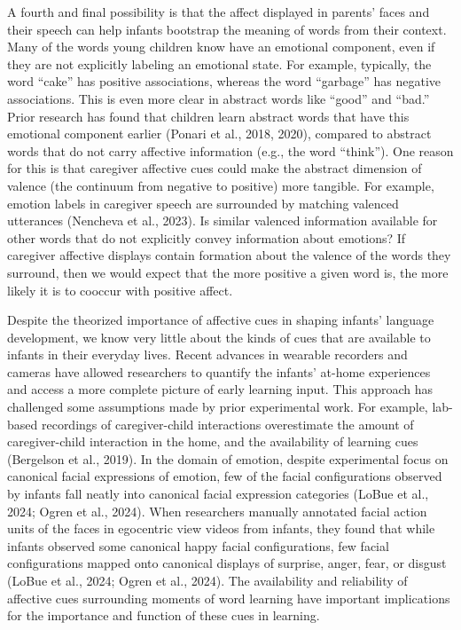 \documentclass[10pt, letterpaper]{article}
\begin{document}
A fourth and final possibility is that the affect displayed in parents'
faces and their speech can help infants bootstrap the meaning of words
from their context. Many of the words young children know have an
emotional component, even if they are not explicitly labeling an
emotional state. For example, typically, the word ``cake'' has positive
associations, whereas the word ``garbage'' has negative associations.
This is even more clear in abstract words like ``good'' and ``bad.''
Prior research has found that children learn abstract words that have
this emotional component earlier (Ponari et al., 2018, 2020), compared
to abstract words that do not carry affective information (e.g., the
word ``think''). One reason for this is that caregiver affective cues
could make the abstract dimension of valence (the continuum from
negative to positive) more tangible. For example, emotion labels in
caregiver speech are surrounded by matching valenced utterances
(Nencheva et al., 2023). Is similar valenced information available for
other words that do not explicitly convey information about emotions? If
caregiver affective displays contain formation about the valence of the
words they surround, then we would expect that the more positive a given
word is, the more likely it is to cooccur with positive affect.

Despite the theorized importance of affective cues in shaping infants'
language development, we know very little about the kinds of cues that
are available to infants in their everyday lives. Recent advances in
wearable recorders and cameras have allowed researchers to quantify the
infants' at-home experiences and access a more complete picture of early
learning input. This approach has challenged some assumptions made by
prior experimental work. For example, lab-based recordings of
caregiver-child interactions overestimate the amount of caregiver-child
interaction in the home, and the availability of learning cues
(Bergelson et al., 2019). In the domain of emotion, despite experimental
focus on canonical facial expressions of emotion, few of the facial
configurations observed by infants fall neatly into canonical facial
expression categories (LoBue et al., 2024; Ogren et al., 2024). When
researchers manually annotated facial action units of the faces in
egocentric view videos from infants, they found that while infants
observed some canonical happy facial configurations, few facial
configurations mapped onto canonical displays of surprise, anger, fear,
or disgust (LoBue et al., 2024; Ogren et al., 2024). The availability
and reliability of affective cues surrounding moments of word learning
have important implications for the importance and function of these
cues in learning.
\end{document}
